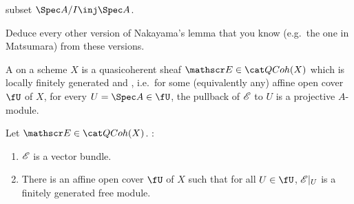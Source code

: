 subset $\Spec A/I\inj\Spec A$.
\begin{ex}
Deduce every other version of Nakayama's lemma that you know (e.g.\ the one in Matsumara) from these versions.
\end{ex}
\begin{defn}
A  on a scheme $X$ is a quasicoherent sheaf $\sE\in\QCoh(X)$ which is locally finitely
generated and , i.e.\ for some (equivalently any) affine open cover $\fU$ of $X$, for
every $U = \Spec A\in\fU$, the pullback of $\mathscr E$ to $U$ is a projective $A$-module.
\end{defn}
\begin{prop}
\label{2vb}
Let $\sE\in\QCoh(X)$. \TFAE:
\begin{enumerate}
	\item $\mathscr E$ is a vector bundle.
	\item There is an affine open cover $\fU$ of $X$ such that for all $U\in\fU$, $\mathscr E|_U$ is a finitely generated
	free module.
\end{enumerate}
\end{prop}
